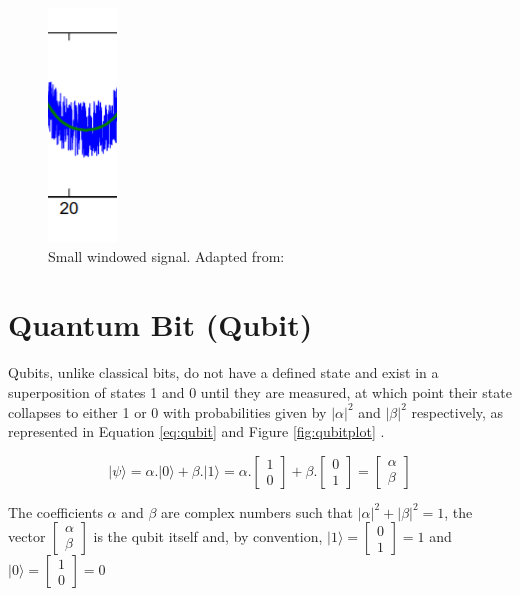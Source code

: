		
		\begin{figure}[!h]
			\centering
			\includegraphics[width=0.1\linewidth]{images/windowedNoisySignal}
			\caption[Windowed signal]{Small windowed signal. Adapted from: \cite{olama2011design}}
			\label{fig:windowednoisysignal}
		\end{figure}

	
	\section{Quantum Bit (Qubit)}
		\par Qubits, unlike classical bits, do not have a defined state and exist in a superposition of states 1 and 0 until they are measured, at which point their state collapses to either 1 or 0 with probabilities given by $|\alpha|^2$ and $|\beta|^2$ respectively, as represented in Equation \ref{eq:qubit} and Figure \ref{fig:qubitplot} \cite{da2018introduccao}.
		
		\begin{equation}
			| \psi \rangle = \alpha . | 0 \rangle + \beta . | 1 \rangle = 
			\alpha . \begin{bmatrix}
				1 \\
				0
			\end{bmatrix} + \beta .	\begin{bmatrix}
				0 \\
				1
			\end{bmatrix} = 
			\begin{bmatrix}
				\alpha \\
				\beta
			\end{bmatrix}
			\label{eq:qubit}
		\end{equation}
	
		\par The coefficients $\alpha$ and $\beta$ are complex numbers such that ${|\alpha|}^2 + {|\beta|}^2 = 1$, the vector 
		$\begin{bmatrix}
			\alpha \\
			\beta 
		\end{bmatrix}$ is the qubit itself and, by convention, $| 1 \rangle = 
		\begin{bmatrix}
			0 \\
			1
		\end{bmatrix} = 1$ and $| 0 \rangle = 
		\begin{bmatrix}
			1 \\
			0
		\end{bmatrix} = 0$
	
